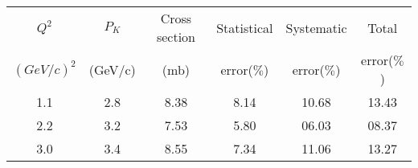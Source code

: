 \begin{center}
\begin{tabular}{||c|c|c|c|c|c||}\hline
 $Q^2$ & $P_K$ & Cross section & Statistical & Systematic & Total \\
 $(GeV/c)^2$ & (GeV/c)& (mb) & error($\%$)& error($\%$)&error($\%$) \\\hline
1.1 & 2.8& 8.38 & 8.14 &10.68 & 13.43\\
2.2 & 3.2& 7.53 & 5.80 &06.03 & 08.37\\
3.0 & 3.4& 8.55 & 7.34 &11.06 & 13.27\\\hline
\end{tabular}
\end{center}